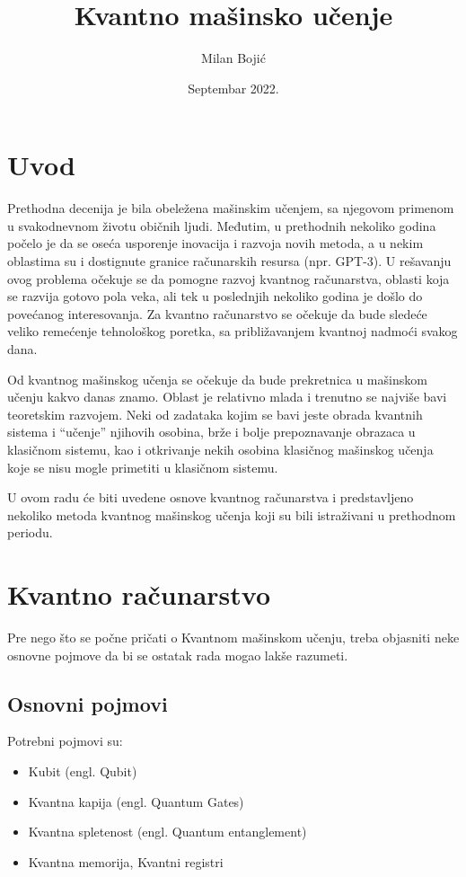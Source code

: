 \documentclass[12pt, letterpaper, oneside]{article}
\title{Kvantno mašinsko učenje}
\author{Milan Bojić}
\date{Septembar 2022.}
\begin{document}
\maketitle
\newpage

\tableofcontents
\newpage
\section{Uvod}
Prethodna decenija je bila obeležena mašinskim učenjem, sa njegovom primenom u svakodnevnom životu običnih ljudi.
Međutim, u prethodnih nekoliko godina počelo je da se oseća usporenje inovacija i razvoja novih metoda, a u nekim oblastima su i dostignute granice računarskih resursa (npr. GPT-3).
U rešavanju ovog problema očekuje se da pomogne razvoj kvantnog računarstva, oblasti koja  se razvija gotovo pola veka, ali tek u poslednjih nekoliko godina je došlo do
povećanog interesovanja. Za kvantno računarstvo se očekuje da bude sledeće veliko remećenje tehnološkog poretka, sa približavanjem kvantnoj nadmoći svakog dana.

Od kvantnog mašinskog učenja se očekuje da bude prekretnica u mašinskom učenju kakvo danas znamo. Oblast je relativno mlada i trenutno se najviše bavi teoretskim razvojem.
Neki od zadataka kojim se bavi jeste obrada kvantnih sistema i ``učenje'' njihovih osobina, brže i bolje prepoznavanje obrazaca u klasičnom sistemu, kao i
otkrivanje nekih osobina klasičnog mašinskog učenja koje se nisu mogle primetiti u klasičnom sistemu.

U ovom radu će biti uvedene osnove kvantnog računarstva i predstavljeno nekoliko metoda kvantnog mašinskog učenja koji su bili istraživani u prethodnom periodu.

\newpage
\section{Kvantno računarstvo}
Pre nego što se počne pričati o Kvantnom mašinskom učenju, treba objasniti neke osnovne pojmove da bi se ostatak rada mogao lakše razumeti.

\subsection{Osnovni pojmovi}
Potrebni pojmovi su:
\begin{itemize}
    \item Kubit (engl. Qubit)
    \item Kvantna kapija (engl. Quantum Gates)
    \item Kvantna spletenost (engl. Quantum entanglement)
    \item Kvantna memorija, Kvantni registri
\end{itemize}
\end{document}
